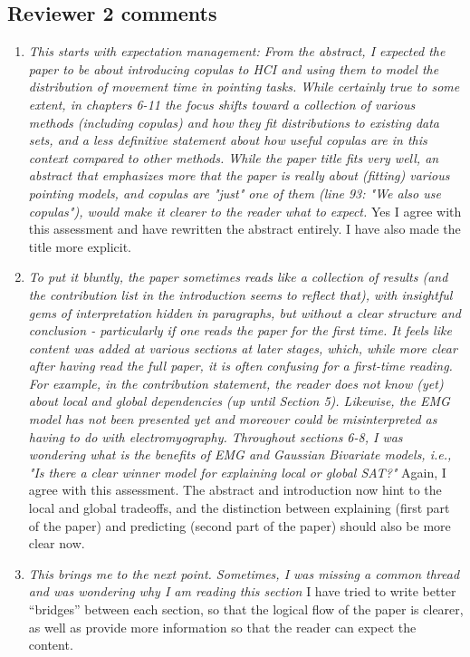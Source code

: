 \documentclass{article}
\begin{document}
\subsection*{Reviewer 2 comments}
\begin{enumerate}
    \item \textit{This starts with expectation management: From the abstract, I expected the paper to be about introducing copulas to HCI and using them to model the distribution of movement time in pointing tasks. While certainly true to some extent, in chapters 6-11 the focus shifts toward a collection of various methods (including copulas) and how they fit distributions to existing data sets, and a less definitive statement about how useful copulas are in this context compared to other methods. While the paper title fits very well, an abstract that emphasizes more that the paper is really about (fitting) various pointing models, and copulas are "just" one of them (line 93: "We also use copulas"), would make it clearer to the reader what to expect. } Yes I agree with this assessment and have rewritten the abstract entirely. I have also made the title more explicit.
    \item \textit{To put it bluntly, the paper sometimes reads like a collection of results (and the contribution list in the introduction seems to reflect that), with insightful gems of interpretation hidden in paragraphs, but without a clear structure and conclusion - particularly if one reads the paper for the first time. It feels like content was added at various sections at later stages, which, while more clear after having read the full paper, it is often confusing for a first-time reading. For example, in the contribution statement, the reader does not know (yet) about local and global dependencies (up until Section 5). Likewise, the EMG model has not been presented yet and moreover could be misinterpreted as having to do with electromyography. Throughout sections 6-8, I was wondering what is the benefits of EMG and Gaussian Bivariate models, i.e., "Is there a clear winner model for explaining local or global SAT?"} Again, I agree with this assessment. The abstract and introduction now hint to the local and global tradeoffs, and the distinction between explaining (first part of the paper) and predicting (second part of the paper) should also be more clear now.
    \item \textit{This brings me to the next point. Sometimes, I was missing a common thread and was wondering why I am reading this section} I have tried to write better ``bridges'' between each section, so that the logical flow of the paper is clearer, as well as provide more information so that the reader can expect the content.

\end{enumerate}
\end{document}
